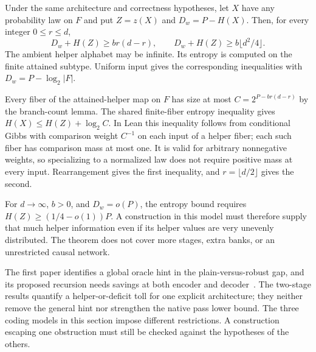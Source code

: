 \begin{theorem}\label{thm:local-helper-entropy}
Under the same architecture and correctness hypotheses, let $X$ have any
probability law on $F$ and put $Z=z(X)$ and $D_w=P-H(X)$.  Then, for every
integer $0\le r\le d$,
\begin{equation}\label{eq:local-helper-entropy}
  D_w+H(Z)\ge br(d-r),
  \qquad D_w+H(Z)\ge b\lfloor d^2/4\rfloor.
\end{equation}
The ambient helper alphabet may be infinite.  Its entropy is computed on the
finite attained subtype.  Uniform input gives the corresponding inequalities
with $D_w=P-\log_2|F|$.
\end{theorem}
\begin{proofoutline}
Every fiber of the attained-helper map on $F$ has size at most
$C=2^{P-br(d-r)}$ by the branch-count lemma.  The shared finite-fiber entropy
inequality gives $H(X)\le H(Z)+\log_2 C$.  In Lean this inequality follows
from conditional Gibbs with comparison weight $C^{-1}$ on each input of a
helper fiber; each such fiber has comparison mass at most one.  It is valid
for arbitrary nonnegative weights, so specializing to a normalized law does
not require positive mass at every input.  Rearrangement gives the first
inequality, and $r=\lfloor d/2\rfloor$ gives the second.
\end{proofoutline}

For $d\to\infty$, $b>0$, and $D_w=o(P)$, the entropy bound requires
$H(Z)\ge(1/4-o(1))P$.  A construction in this model must therefore supply
that much helper information even if its helper values are very unevenly
distributed.  The theorem does not cover more stages, extra banks, or an
unrestricted causal network.

The first paper identifies a global oracle hint in the plain-versus-robust
gap, and its proposed recursion needs savings at both encoder and
decoder~\cite[sections ``Plain versus robust'' and ``The construction
side'']{FirstPaper2026}.  The two-stage results quantify a helper-or-deficit
toll for one explicit architecture; they neither remove the general hint nor
strengthen the native pass lower bound.  The three coding models in this
section impose different restrictions.  A construction escaping one
obstruction must still be checked against the hypotheses of the others.
